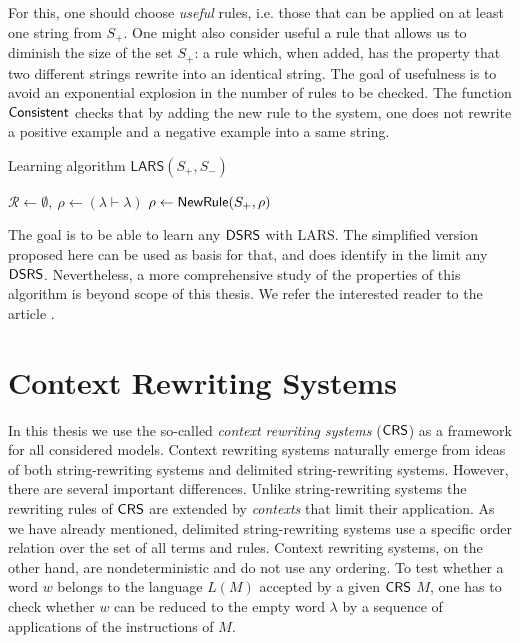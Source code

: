 For this, one should choose \emph{useful} rules, i.e. those that can be applied on at least one string from $S_+$. One might also consider useful a rule that allows us to diminish the size of the set $S_+$: a rule which, when added, has the property that two different strings rewrite into an identical string. The goal of usefulness is to avoid an exponential explosion in the number of rules to be checked. The function $\Consistent$ checks that by adding the new rule to the system, one does not rewrite a positive example and a negative example into a same string.


\begin{algorithm}
\caption{Learning algorithm $\mathsf{LARS}(S_+, S_-)$}
\label{algorithm:lars}
\LinesNumbered
{}
$\mathcal{R} \gets \emptyset,\ \rho \gets (\lambda \vdash \lambda)$\;
{$\rho \gets \NewRule(S_+, \rho)$\;
}
\;
\end{algorithm}

The goal is to be able to learn any $\mbox{\sf DSRS}$ with LARS. The simplified version proposed here can be used as basis for that, and does identify in the limit any $\mbox{\sf DSRS}$. Nevertheless, a more comprehensive study of the properties of this algorithm is beyond scope of this thesis. We refer the interested reader to the article \cite{Eyraud2007}.

\section{Context Rewriting Systems}
\label{section:context-rewriting-systems}

In this thesis we use the so-called \emph{context rewriting systems} ($\mbox{\sf CRS\/}$) as a framework for all considered models. Context rewriting systems naturally emerge from ideas of both string-rewriting systems and delimited string-rewriting systems. However, there are several important differences. Unlike string-rewriting systems the rewriting rules of $\mbox{\sf CRS\/}$ are extended by \emph{contexts} that limit their application. As we have already mentioned, delimited string-rewriting systems use a specific order relation over the set of all terms and rules. Context rewriting systems, on the other hand, are nondeterministic and do not use any ordering. To test whether a word $w$ belongs to the language $L(M)$ accepted by a given $\mbox{\sf CRS\/}$ $M$, one has to check whether $w$ can be reduced to the empty word $\lambda$ by a sequence of applications of the instructions of $M$.

